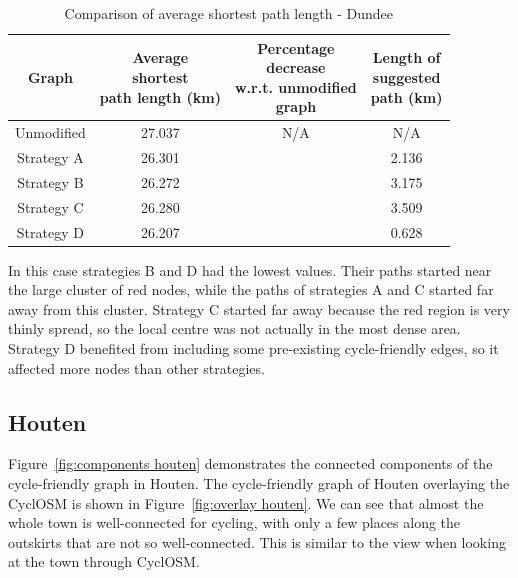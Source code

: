 \documentclass[12pt,a4paper]{report}
\begin{document}
\begin{table}[ht!]
    \centering
    \begin{tabular}{|c|c|c|c|}
        \hline
        Graph & \makecell{Average \\shortest \\path length (km)} & \makecell{Percentage \\decrease \\w.r.t. unmodified \\graph} & \makecell{Length of \\suggested \\path (km)}\\
        \hline
        Unmodified & 27.037 & N/A & N/A\\
        Strategy A & 26.301 &  & 2.136\\
        Strategy B & 26.272 & & 3.175\\
        Strategy C & 26.280 & & 3.509\\
        Strategy D & 26.207 & & 0.628\\
        \hline
    \end{tabular}
    \caption{Comparison of average shortest path length - Dundee}
    \label{tab:avg dundee}
\end{table}

In this case strategies B and D had the lowest values. Their paths started near the large cluster of red nodes, while the paths of strategies A and C started far away from this cluster. Strategy C started far away because the red region is very thinly spread, so the local centre was not actually in the most dense area. Strategy D benefited from including some pre-existing cycle-friendly edges, so it affected more nodes than other strategies.

\subsection{Houten}\label{sec:houten}
Figure~\ref{fig:components houten} demonstrates the connected components of the cycle-friendly graph in Houten. The cycle-friendly graph of Houten overlaying the CyclOSM is shown in Figure~\ref{fig:overlay houten}. We can see that almost the whole town is well-connected for cycling, with only a few places along the outskirts that are not so well-connected. This is similar to the view when looking at the town through CyclOSM.
\end{document}
